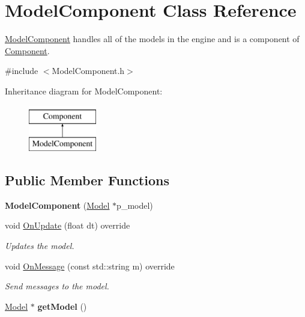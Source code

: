 \hypertarget{class_model_component}{}\section{Model\+Component Class Reference}
\label{class_model_component}


\mbox{\hyperlink{class_model_component}{Model\+Component}} handles all of the models in the engine and is a component of \mbox{\hyperlink{class_component}{Component}}.  




{\ttfamily \#include $<$Model\+Component.\+h$>$}

Inheritance diagram for Model\+Component\+:\begin{figure}[H]
\begin{center}
\leavevmode
\includegraphics[height=2.000000cm]{class_model_component}
\end{center}
\end{figure}
\subsection*{Public Member Functions}
\begin{DoxyCompactItemize}
\item 
\mbox{\label{class_model_component_ae977c1907effa18df65fdda3702ab94b}} 
{\bfseries Model\+Component} (\mbox{\hyperlink{class_model}{Model}} $\ast$p\+\_\+model)
\item 
\mbox{\label{class_model_component_a5def59776319943854fb5da3dc515051}} 
void \mbox{\hyperlink{class_model_component_a5def59776319943854fb5da3dc515051}{On\+Update}} (float dt) override
\begin{DoxyCompactList}\small\item\em Updates the model. \end{DoxyCompactList}\item 
\mbox{\label{class_model_component_a48d6170e857f323839039ce54e9418e1}} 
void \mbox{\hyperlink{class_model_component_a48d6170e857f323839039ce54e9418e1}{On\+Message}} (const std\+::string m) override
\begin{DoxyCompactList}\small\item\em Send messages to the model. \end{DoxyCompactList}\item 
\mbox{\label{class_model_component_a6aecf1cfea00c789aa9484ae0102e32c}} 
\mbox{\hyperlink{class_model}{Model}} $\ast$ {\bfseries get\+Model} ()
\end{DoxyCompactItemize}


